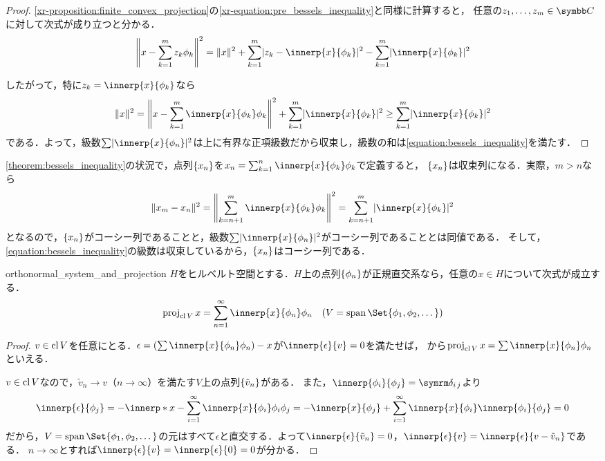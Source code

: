 \documentclass[../../main]{subfiles}
\begin{document}
\begin{proof}
  \cref{xr-proposition:finite_convex_projection}の\cref{xr-equation:pre_bessels_inequality}と同様に計算すると，
  任意の\(z_1,\dots,z_m\in\numset{C}\)に対して次式が成り立つと分かる．
  \[
    \vnorm*{x-\sum_{k=1}^mz_k\phi_k}^2 = \vnorm{x}^2+\sum_{k=1}^m\abs{z_k-\innerp{x}{\phi_k}}^2-\sum_{k=1}^m\abs{\innerp{x}{\phi_k}}^2
  \]

  したがって，特に\(z_k=\innerp{x}{\phi_k}\)なら
  \[
    \vnorm{x}^2 = \vnorm*{x-\sum_{k=1}^m\innerp{x}{\phi_k}\phi_k}^2+\sum_{k=1}^m\abs{\innerp{x}{\phi_k}}^2
    \geq \sum_{k=1}^m\abs{\innerp{x}{\phi_k}}^2
  \]
  である．よって，級数\(\sum\abs{\innerp{x}{\phi_n}}^2\)は上に有界な正項級数だから収束し，級数の和は\cref{equation:bessels_inequality}を満たす．
\end{proof}

\cref{theorem:bessels_inequality}の状況で，点列\(\lbrace x_n\rbrace\)を\(x_n=\sum_{k=1}^n\innerp{x}{\phi_k}\phi_k\)で定義すると，
\(\lbrace x_n\rbrace\)は収束列になる．実際，\(m>n\)なら
\[
  \vnorm{x_m-x_n}^2 = \vnorm*{\sum_{k=n+1}^m\innerp{x}{\phi_k}\phi_k}^2
  = \sum_{k=n+1}^m\abs{\innerp{x}{\phi_k}}^2
\]
となるので，\(\lbrace x_n\rbrace\)がコーシー列であることと，級数\(\sum\abs{\innerp{x}{\phi_n}}^2\)がコーシー列であることとは同値である．
そして，\cref{equation:bessels_inequality}の級数は収束しているから，\(\lbrace x_n\rbrace\)はコーシー列である．

\begin{proposition}{}{orthonormal_system_and_projection}
  \(H\)をヒルベルト空間とする．\(H\)上の点列\(\lbrace\phi_n\rbrace\)が正規直交系なら，任意の\(x\in H\)について次式が成立する．
  \[
    \proj_{\clsr V}x = \sum_{n=1}^\infty\innerp{x}{\phi_n}\phi_n\quad(V=\spannedby\Set{\phi_1,\phi_2,\dotsc})
  \]
\end{proposition}

\begin{proof}
  \(v\in\operatorname{cl} V\)を任意にとる．\(\epsilon=(\sum\innerp{x}{\phi_n}\phi_n)-x\)が\(\innerp{\epsilon}{v}=0\)を満たせば，
  から\(\proj_{\clsr V}x=\sum\innerp{x}{\phi_n}\phi_n\)といえる．

  \(v\in\operatorname{cl} V\)なので，\(\tilde{v}_n\to v\)（\(n\to\infty\)）を満たす\(V\)上の点列\(\lbrace\tilde{v}_n\rbrace\)がある．
  また，\(\innerp{\phi_i}{\phi_j}=\kdelta{i}{j}\)より
  \[
    \innerp{\epsilon}{\phi_j} = -\innerp*{x-\sum_{i=1}^\infty\innerp{x}{\phi_i}\phi_i}{\phi_j}
    = -\innerp{x}{\phi_j}+\sum_{i=1}^\infty\innerp{x}{\phi_i}\innerp{\phi_i}{\phi_j}
    = 0
  \]
  だから，\(V=\spannedby\Set{\phi_1,\phi_2,\dotsc}\)の元はすべて\(\epsilon\)と直交する．よって\(\innerp{\epsilon}{\tilde{v}_n}=0\)，\(\innerp{\epsilon}{v}=\innerp{\epsilon}{v-\tilde{v}_n}\)である．
  \(n\to\infty\)とすれば\(\innerp{\epsilon}{v}=\innerp{\epsilon}{0}=0\)が分かる．
\end{proof}
\end{document}
